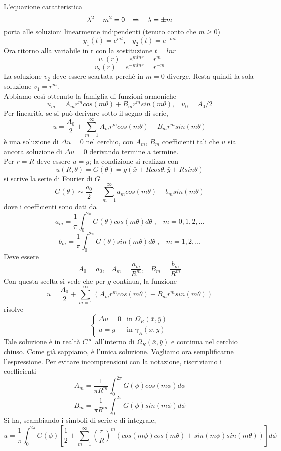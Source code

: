L'equazione caratteristica
\[
	\lambda^2 - m^2=0 \;\;\; \Rightarrow \;\;\; \lambda= \pm m
\]
porta alle soluzioni linearmente indipendenti (tenuto conto che $m\geq 0$)
\[
	y_1(t)= e^{mt}, \;\;\; y_2(t)= e^{-mt}
\]
Ora ritorno alla variabile in r con la sostituzione $t= ln r$
\[
	v_1(r)= e^{m lnr}= r^m
\]
\[
	v_2(r)= e^{-m lnr}= r^{-m}
\]
La soluzione $v_2$ deve essere scartata perch\'e in $m=0$ diverge.
Resta quindi la sola soluzione $v_1=r^m$.\\
Abbiamo cos\`i ottenuto la famiglia di funzioni armoniche
\[
	u_m= A_m r^m cos(m \theta)+ B_m r^m sin (m \theta), \;\;\; u_0= A_0/2
\]
Per linearit\`a, se si pu\`o derivare sotto il segno di serie,
\[
	u= \frac{A_0}{2} + \sum_{m=1}^{\infty}
	A_m r^m cos(m \theta)+ B_m r^m sin (m \theta)
\]
\`e una soluzione di $\Delta u=0$ nel cerchio, con $A_m$, $B_m$ coefficienti
tali che $u$ sia ancora soluzione di $\Delta u= 0$ derivando termine a termine.\\
Per $r=R$ deve essere $u=g$; la condizione si realizza con
\[
	u(R, \theta)= G(\theta)= g(\bar{x}+ Rcos \theta, \bar{y} + Rsin\theta)
\]
si scrive la serie di Fourier di $G$
\[
	G(\theta) \sim \frac{a_0}{2}+ 
	\sum_{m=1}^{\infty} a_m cos (m \theta) + b_m sin (m \theta)
\]
dove i coefficienti sono dati da
\[
	a_m = \frac{1}{\pi}
	\int_{0}^{2 \pi} G(\theta)cos(m \theta) d\theta \; , \;\;\; m=0,1,2,\ldots
\]
\[
	b_m = \frac{1}{\pi}
	\int_{0}^{2 \pi} G(\theta)sin(m \theta) d\theta \; , \;\;\; m=1,2,\ldots
\]
Deve essere
\[
	A_0=a_0, \;\;\; A_m=\frac{a_m}{R^m}, \;\;\; B_m = \frac{b_m}{R^m}
\]
Con questa scelta si vede che per $g$ continua, la funzione
\[
	u=\frac{A_0}{2}+ \sum_{m=1}^{\infty} \left(
	A_mr^m cos (m \theta)+ B_m r^m sin (m \theta)
	\right)
\]
risolve
\[
	\left\{
	\begin{array}{ll}
		\Delta u=0 	& \text{in } \Omega_R(\bar{x}, \bar{y}) \\
		u=g 		& \text{in } \gamma_R(\bar{x}, \bar{y})
	\end{array}
	\right.
\]
Tale soluzione \`e in realt\`a $C^{\infty}$ all'interno di $\Omega_R (\bar{x}, \bar{y})$
e continua nel cerchio chiuso. Come gi\`a sappiamo, \`e l'unica soluzione.
Vogliamo ora semplificarne l'espressione. Per evitare incomprensioni con la
notazione, riscriviamo i coefficienti
\[
	A_m = \frac{1}{\pi R^m}
	\int_{0}^{2 \pi} G(\phi)cos(m \phi) d\phi
\]
\[
	B_m = \frac{1}{\pi R^m}
	\int_{0}^{2 \pi} G(\phi)sin(m \phi) d\phi
\]
Si ha, scambiando i simboli di serie e di integrale,
\[
	u= \frac{1}{\pi} \int_{0}^{2\pi} G(\phi)
	\left[
	\frac{1}{2}+ \sum_{m=1}^{\infty} \left( \frac{r}{R} \right)^m
	\left(
	cos(m \phi)cos(m \theta) + sin(m\phi)sin(m \theta)
	\right)
	\right] d\phi
\]
